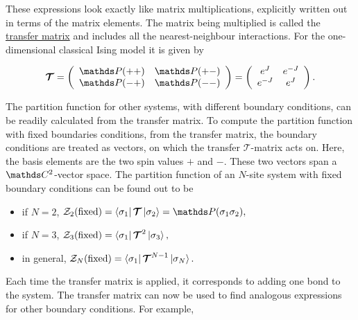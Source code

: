 \documentclass{homework}
\begin{document}
These expressions look exactly like matrix multiplications, explicitly written out in terms of the matrix elements. The matrix being multiplied is called the \underline{transfer matrix} and includes all the nearest-neighbour interactions. For the one-dimensional classical Ising model it is given by 

\begin{equation}
    \bm{\mathcal{T}} = \left( \begin{array}{cc}
        \prob(++) & \prob(+-) \\
         \prob(-+) &  \prob(--)
    \end{array} \right) = \left(\begin{array}{cc}
        e^J & e^{-J}  \\
        e^{-J} & e^J
    \end{array}\right).
\end{equation}

The partition function for other systems, with different boundary conditions, can be readily calculated from the transfer matrix. 
To compute the partition function with fixed boundaries conditions, from the transfer matrix, the boundary conditions are treated as vectors, on which the transfer $\bm{\mathcal{T}}$-matrix acts on. Here, the basis elements are the two spin values $+$ and $-$. These two vectors span a $\ctwo$-vector space. The partition function of an $N$-site system with fixed boundary conditions can be found out to be 

\begin{itemize}
    \item if $N=2$,
        $
        \mathcal{Z}_2(\textnormal{fixed}) = \bra{\sigma_1} \bm{\mathcal{T}} \ket{\sigma_2} = \prob(\sigma_1 \sigma_2),
        $
    \item if $N=3$,
        $
        \mathcal{Z}_3(\textnormal{fixed}) = \bra{\sigma_1} \bm{\mathcal{T}}^2 \ket{\sigma_3},
        $
    \item in general,
        $
        \mathcal{Z}_N(\textnormal{fixed}) = \bra{\sigma_1} \bm{\mathcal{T}}^{N-1} \ket{\sigma_N}.
        $
\end{itemize}

Each time the transfer matrix is applied, it corresponds to adding one bond to the system. The transfer matrix can now be used to find analogous expressions for other boundary conditions. For example, \\
\end{document}
